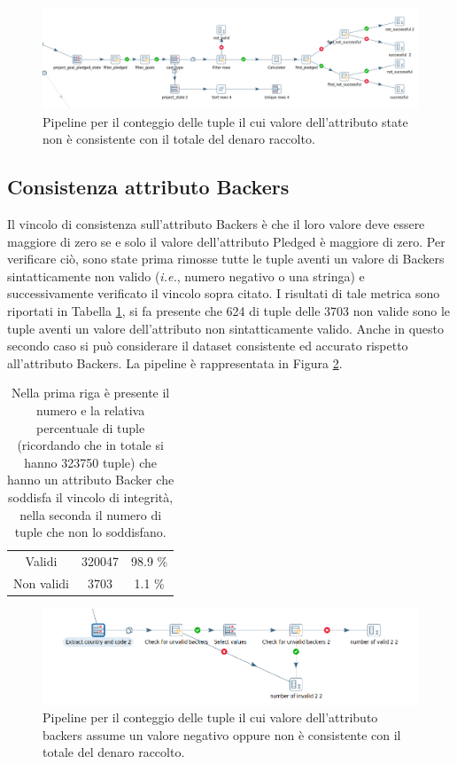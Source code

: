\begin{figure}[h!]
	\centering
	\includegraphics[width=0.7\linewidth]{images/DQ_stateaconsistency}
	\caption{Pipeline per il conteggio delle tuple il cui valore dell'attributo state non è consistente con il totale del denaro raccolto.}
	\label{fig:dqstateaconsistency}
\end{figure}


\subsection{Consistenza attributo Backers}
Il vincolo di consistenza sull'attributo Backers è che il loro valore deve essere maggiore di zero se e solo il valore dell'attributo Pledged è maggiore di zero.
Per verificare ciò, sono state prima rimosse tutte le tuple aventi un valore di Backers sintatticamente non valido (\textit{i.e.}, numero negativo o una stringa) e successivamente verificato il vincolo sopra citato.
I risultati di tale metrica sono riportati in Tabella \ref{tab:con_backers}, si fa presente che 624 di tuple delle 3703 non valide sono le tuple aventi un valore dell'attributo non sintatticamente valido.
Anche in questo secondo caso si può considerare il dataset consistente ed accurato rispetto all'attributo Backers.
La pipeline è rappresentata in Figura \ref{fig:dqbackersconsistency}.

\begin{table}
	\caption{Nella prima riga è presente il numero e la relativa percentuale di tuple (ricordando che in totale si hanno 323750 tuple) che hanno un attributo Backer che soddisfa il vincolo di integrità, nella seconda il numero di tuple che non lo soddisfano.}
	
	\label{tab:con_backers}
	
	\centering
	\begin{tabular}{c|cc}
		Validi & 320047 & 98.9 \% \\ 
		Non validi & 3703 & 1.1 \% \\
	\end{tabular}
\end{table} 

\begin{figure}[h!]
	\centering
	\includegraphics[width=0.7\linewidth]{images/DQ_backersconsistency}
	\caption{Pipeline per il conteggio delle tuple il cui valore dell'attributo backers assume un valore negativo oppure non è consistente con il totale del denaro raccolto.}
	\label{fig:dqbackersconsistency}
\end{figure}


